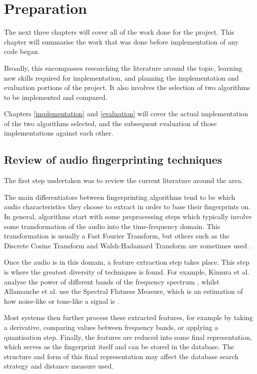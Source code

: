 \documentclass[12pt,a4paper,twoside,openright]{report}
\begin{document}
\chapter{Preparation}
\label{preparation}

The next three chapters will cover all of the work done for the project. This chapter will summarise the work that was done before implementation of any code began. 

Broadly, this encompasses researching the literature around the topic, learning new skills required for implementation, and planning the implementation and evaluation portions of the project. It also involves the selection of two algorithms to be implemented and compared.

Chapters \ref{implementation} and \ref{evaluation} will cover the actual implementation of the two algorithms selected, and the subsequent evaluation of those implementations against each other.


\section{Review of audio fingerprinting techniques}

The first step undertaken was to review the current literature around the area.

The main differentiators between fingerprinting algorithms tend to be which audio characteristics they choose to extract in order to base their fingerprints on. In general, algorithms start with some preprocessing steps which typically involve some transformation of the audio into the time-frequency domain. This transformation is usually a Fast Fourier Transform, but others such as the Discrete Cosine Transform and Walsh-Hadamard Transform are sometimes used \cite{Cano02}.

Once the audio is in this domain, a feature extraction step takes place. This step is where the greatest diversity of techniques is found. For example, Kimura et al. analyse the power of different bands of the frequency spectrum \cite{Kimura01}, whilst Allamanche et al. use the Spectral Flatness Measure, which is an estimation of how noise-like or tone-like a signal is \cite{Allamanche01}.

Most systems then further process these extracted features, for example by taking a derivative, comparing values between frequency bands, or applying a quantisation step. Finally, the features are reduced into some final representation, which serves as the fingerprint itself and can be stored in the database. The structure and form of this final representation may affect the database search strategy and distance measure used.
\end{document}
